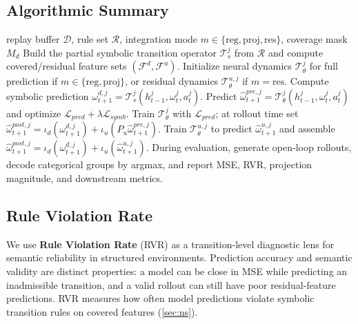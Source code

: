 \documentclass{article}
\theoremstyle{plain}
\theoremstyle{definition}
\theoremstyle{remark}
\begin{document}
\subsection{Algorithmic Summary}
\label{sec:algorithm}

\begin{algorithm}[t]
  \caption{NS-MAWM training and rollout inference}
  \label{alg:ns_mawm}
  \begin{algorithmic}[1]
    \REQUIRE replay buffer $\mathcal{D}$, rule set $\mathcal{R}$, integration mode $m \in \{\mathrm{reg},\mathrm{proj},\mathrm{res}\}$, coverage mask $M_d$
    \STATE Build the partial symbolic transition operator $\mathcal{T}^j_s$ from $\mathcal{R}$ and compute covered/residual feature sets $(\mathcal{F}^d,\mathcal{F}^u)$.
    \STATE Initialize neural dynamics $\mathcal{T}^j_\theta$ for full prediction if $m\in\{\mathrm{reg},\mathrm{proj}\}$, or residual dynamics $\mathcal{T}^{u,j}_\theta$ if $m=\mathrm{res}$.
    \STATE Compute symbolic prediction $\omega^{d,j}_{t+1}=\mathcal{T}^j_s(h^j_{t-1},\omega^j_t,a^j_t)$.
    \STATE Predict $\hat{\omega}^{pre,j}_{t+1}=\mathcal{T}^j_\theta(h^j_{t-1},\omega^j_t,a^j_t)$ and optimize $\mathcal{L}_{pred}+\lambda\mathcal{L}_{symb}$.
    \STATE Train $\mathcal{T}^j_\theta$ with $\mathcal{L}_{pred}$; at rollout time set $\hat{\omega}^{post,j}_{t+1}=\iota_d(\omega^{d,j}_{t+1})+\iota_u(P_u\hat{\omega}^{pre,j}_{t+1})$.
    \ELSE
    \STATE Train $\mathcal{T}^{u,j}_\theta$ to predict $\hat{\omega}^{u,j}_{t+1}$ and assemble $\hat{\omega}^{post,j}_{t+1}=\iota_d(\omega^{d,j}_{t+1})+\iota_u(\hat{\omega}^{u,j}_{t+1})$.
    \ENDIF
    \ENDFOR
    \STATE During evaluation, generate open-loop rollouts, decode categorical groups by argmax, and report MSE, RVR, projection magnitude, and downstream metrics.
  \end{algorithmic}
\end{algorithm}

\subsection{Rule Violation Rate}
\label{sec:rvr}

We use \textbf{Rule Violation Rate} (RVR) as a transition-level diagnostic lens for semantic reliability in structured environments. Prediction accuracy and semantic validity are distinct properties: a model can be close in MSE while predicting an inadmissible transition, and a valid rollout can still have poor residual-feature predictions. RVR measures how often model predictions violate symbolic transition rules on covered features (\autoref{sec:ns}).
\end{document}
